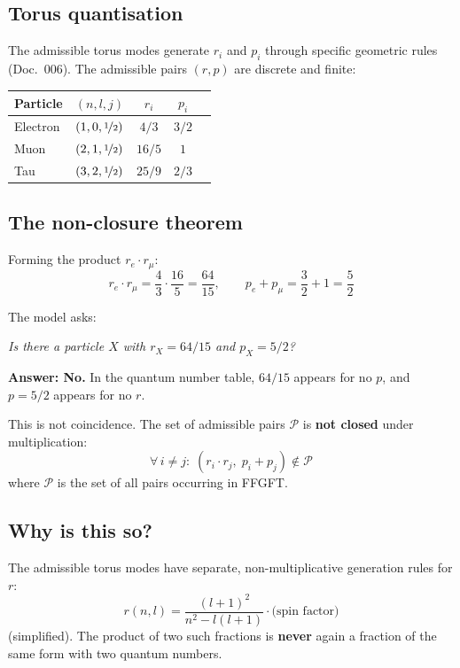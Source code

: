 \subsection{Torus quantisation}

The admissible torus modes generate $r_i$ and $p_i$ through specific geometric
rules (Doc.~006). The admissible pairs $(r,p)$ are discrete and finite:

\begin{center}
{\footnotesize
\begin{tabular}{lcccc}
\toprule
\textbf{Particle} & \textbf{$(n,l,j)$} & \textbf{$r_i$} & \textbf{$p_i$} \\
\midrule
Electron & $(1,0,\nicefrac{1}{2})$ & $4/3$ & $3/2$ \\
Muon     & $(2,1,\nicefrac{1}{2})$ & $16/5$ & $1$ \\
Tau      & $(3,2,\nicefrac{1}{2})$ & $25/9$ & $2/3$ \\
\bottomrule
\end{tabular}
}
\end{center}

\subsection{The non-closure theorem}

Forming the product $r_e \cdot r_\mu$:
\[
  r_e \cdot r_\mu = \frac{4}{3} \cdot \frac{16}{5} = \frac{64}{15},
  \qquad p_e + p_\mu = \frac{3}{2} + 1 = \frac{5}{2}
\]

The model asks:
\begin{center}
  \emph{Is there a particle $X$ with $r_X = 64/15$ and $p_X = 5/2$?}
\end{center}

\textbf{Answer: No.} In the quantum number table, $64/15$ appears for
no $p$, and $p=5/2$ appears for no $r$.

This is not coincidence. The set of admissible pairs $\mathcal{P}$
is \textbf{not closed} under multiplication:
\[
  \forall\, i \neq j:\; (r_i \cdot r_j,\; p_i + p_j) \notin \mathcal{P}
\]
where $\mathcal{P}$ is the set of all pairs occurring in FFGFT.

\subsection{Why is this so?}

The admissible torus modes have separate, non-multiplicative generation rules for $r$:
\[
  r(n,l) = \frac{(l+1)^2}{n^2 - l(l+1)} \cdot \text{(spin factor)}
\]
(simplified). The product of two such fractions is \textbf{never} again
a fraction of the same form with two quantum numbers.


